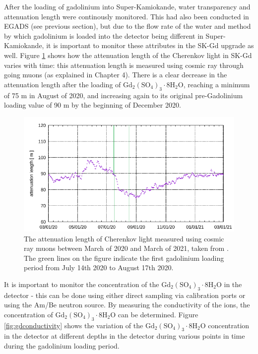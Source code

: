 After the loading of gadolinium into Super-Kamiokande, water transparency and attenuation length were continously monitored. This had also been conducted in EGADS (see previous section), but due to the flow rate of the water and method by which gadolinium is loaded into the detector being different in Super-Kamiokande, it is important to monitor these attributes in the SK-Gd upgrade as well. Figure \ref{fig:gdattenuationlength} shows how the attenuation length of the Cherenkov light in SK-Gd varies with time: this attenuation length is measured using cosmic ray through going muons (as explained in Chapter 4). There is a clear decrease in the attenuation length after the loading of $\mathrm{Gd}_{2}\left(\mathrm{SO}_{4}\right)_{3} \cdot 8 \mathrm{H}_{2} \mathrm{O}$, reaching a minimum of 75 m in August of 2020, and increasing again to its original pre-Gadolinium loading value of 90 m by the beginning of December 2020.  

\begin{figure}
    \includegraphics[width=\textwidth]{Figures/attenuation_length_gd.png}
    \caption{The attenuation length of Cherenkov light measured using cosmic ray muons between March of 2020 and March of 2021, taken from \cite{marti_evaluation_2020}. The green lines on the figure indicate the first gadolinium loading period from July 14th 2020 to August 17th 2020. }
    \label{fig:gdattenuationlength}
\end{figure}

It is important to monitor the concentration of the $\mathrm{Gd}_{2}\left(\mathrm{SO}_{4}\right)_{3} \cdot 8 \mathrm{H}_{2} \mathrm{O}$ in the detector - this can be done using either direct sampling via calibration ports or using the Am/Be neutron source. By measuring the conductivity of the ions, the concentration of $\mathrm{Gd}_{2}\left(\mathrm{SO}_{4}\right)_{3} \cdot 8 \mathrm{H}_{2} \mathrm{O}$ can be determined. Figure \ref{fig:gdconductivity} shows the variation of the $\mathrm{Gd}_{2}\left(\mathrm{SO}_{4}\right)_{3} \cdot 8 \mathrm{H}_{2} \mathrm{O}$ concentration in the detector at different depths in the detector during various points in time during the gadolinium loading period. 

